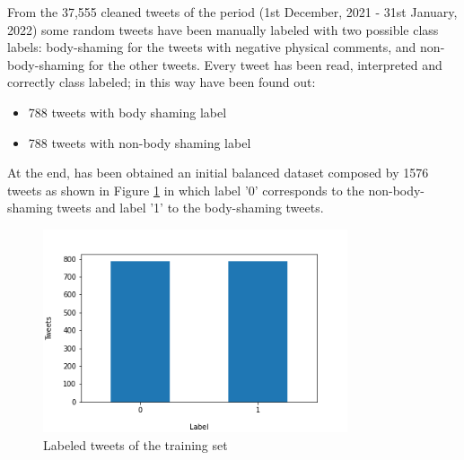 From the 37,555 cleaned tweets of the period (1st December, 2021 - 31st January, 2022) some random tweets have been manually labeled with two possible class labels: body-shaming for the tweets with  negative physical comments, and non-body-shaming for the other tweets.
Every tweet has been read, interpreted and correctly class labeled; in this way have been found out:
\begin{itemize}
\item 788 tweets with body shaming label
\item 788 tweets with non-body shaming label
\end{itemize}
At the end, has been obtained an initial balanced dataset composed by 1576 tweets as shown in Figure \ref{classes} in which label '0' corresponds to the non-body-shaming tweets and label '1' to the body-shaming tweets. 


\begin{figure}[H]
    \centering
    \includegraphics[width= 0.8\textwidth]{images/dataset/training set.png} 
    \caption{Labeled tweets of the training set} 
    \label{classes}
\end{figure}




